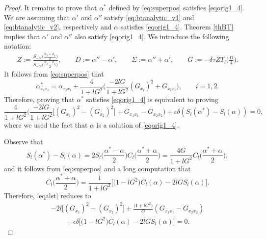 \documentclass[10pt,a4paper]{amsart}
\numberwithin{equation}{section}
\begin{document}
\begin{proof}
It remains to prove that $\alpha^*$ defined by \eqref{eq:superpos} satisfies \eqref{eqorig1_4}. We are assuming that
$\alpha'$ and $\alpha''$ satisfy \eqref{eq:btanalytic_v1} and \eqref{eq:btanalytic_v2}, respectively and $\alpha$ satisfies \eqref{eqorig1_4}. Theorem \ref{thBT} implies that $\alpha'$ and $\alpha''$ also satisfy \eqref{eqorig1_4}. We introduce the following notation:
\begin{gather}\label{Sigmaetall}
Z:= \frac{S_{-\delta\epsilon}\bigl(\frac{\phi_2+\phi_1}{2}\bigr) } {S_{-\delta\epsilon}\bigl(\frac{\phi_2-\phi_1}{2}\bigr)},\qquad D:=\alpha''-\alpha', \qquad \Sigma:=\alpha''+\alpha',
\qquad G:= -\delta\tau Z T_l \biggl(\frac{D}{4}\biggr).
\end{gather}
It follows from \eqref{eq:superpos} that
\begin{equation*}
\alpha^*_{x_ix_i}=\alpha_{x_ix_i}+\frac{4}{1+l G^2}\biggl(\frac{-2l G}{1+l G^2}(G_{x_i})^2+G_{x_ix_i}\biggr), \qquad i=1,2.
\end{equation*}
Therefore, proving that $\alpha^*$ satisfies \eqref{eqorig1_4} is equivalent to
proving
\begin{equation}\label{eqalst}
\frac{4}{1+l G^2}
\biggl(\frac{-2l G}{1+l G^2}\bigl[(G_{x_1})^2-(G_{x_2})^2\bigr]+G_{x_1x_1}-G_{x_2x_2} \biggr) +\epsilon\delta ( S_l(\alpha^*)-S_l(\alpha))=0,
\end{equation}
where we used the fact that $\alpha$ is a solution of \eqref{eqorig1_4}.

Observe that
\[
S_l(\alpha^*)-S_l(\alpha)=2S_l\biggl(\frac{\alpha^*-\alpha}{2}\biggr) C_l\biggl(\frac{\alpha^*+\alpha}{2}\biggr)=
\frac{4G}{1+l G^2}C_l\biggl(\frac{\alpha^*+\alpha}{2}\biggr),
\]
and it follows from \eqref{eq:superpos} and a long computation that
\[
C_l\biggl(\frac{\alpha^*+\alpha}{2}\biggr)=\frac{1}{1+l G^2}\bigl[ \bigl(1-l G^2\bigr)C_l(\alpha)-2l G S_l(\alpha)\bigr].
\]
Therefore, \eqref{eqalst} reduces to
\begin{gather}
-2l\bigl[(G_{x_1})^2-(G_{x_2})^2\bigr]+\frac{\bigl(1+l G^2\bigr)}{G}(G_{x_1x_1}-G_{x_2x_2}) \nonumber\\
\qquad{}+\epsilon\delta\bigl[ \bigl(1-l G^2\bigr)C_l(\alpha)-2l G S_l(\alpha)\bigr]=0.\label{eqalst1}
\end{gather}



\end{proof}
\end{document}
